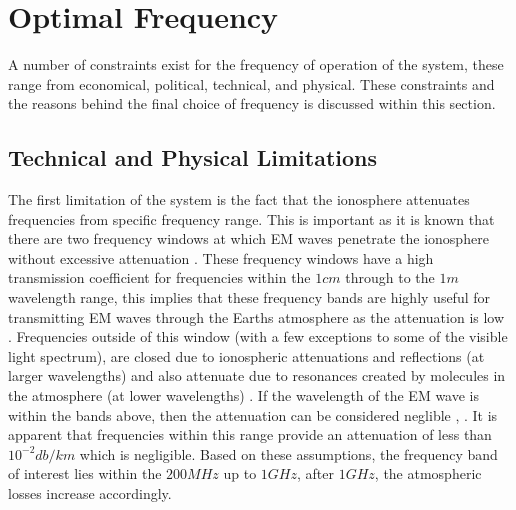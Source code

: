 \documentclass[11pt]{witseiepaper}
\begin{document}



\section{Optimal Frequency} \label{sec:OptimalFrequency}
A number of constraints exist for the frequency of operation of the system, these range from economical, political, technical, and physical. These constraints and the reasons behind the final choice of frequency is discussed within this section.

\subsection{Technical and Physical Limitations} \label{sec:TechnicalandPhysicalLimitations}

The first limitation of the system is the fact that the ionosphere attenuates frequencies from specific frequency range. This is important as it is known that there are two frequency windows at which EM waves penetrate the ionosphere without excessive attenuation \cite{ObjectInformation}.
These frequency windows have a high transmission coefficient for frequencies within the $1 cm$ through to the $1 m$ wavelength range, this implies that these frequency bands are highly useful for transmitting EM waves through the Earths atmosphere as the attenuation is low \cite{frequencyAttenuation}. Frequencies outside of this window (with a few exceptions to some of the visible light spectrum), are closed due to ionospheric attenuations and reflections (at larger wavelengths) and also attenuate due to resonances created by molecules in the atmosphere (at lower wavelengths) \cite{frequencyAttenuation}.  
If the wavelength of the EM wave is within the bands above, then the attenuation can be considered neglible \cite{ionosphereAttenuationStandard}, \cite[p~.15,124]{radarHandbook}. It is apparent that frequencies within this range provide an attenuation of less than $10^{-2} db/km$ which is negligible.
Based on these assumptions, the frequency band of interest lies within the $200 MHz$ up to $1 GHz$, after $1 GHz$, the atmospheric losses increase accordingly.
\end{document}
